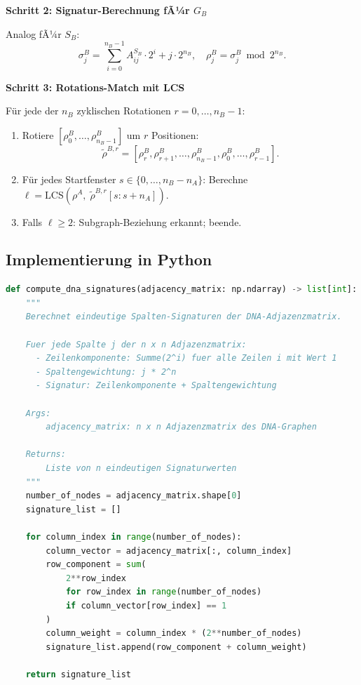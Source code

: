 ﻿\documentclass[a4paper,12pt]{article}
\theoremstyle{definition}
\begin{document}
\textbf{Schritt 2: Signatur-Berechnung fÃ¼r $G_B$}

Analog fÃ¼r $S_B$:
\[
    \sigma_j^B = \sum_{i=0}^{n_B-1} A^{S_B}_{ij} \cdot 2^i + j \cdot 2^{n_B},
    \quad \rho_j^B = \sigma_j^B \bmod 2^{n_B}.
\]

\textbf{Schritt 3: Rotations-Match mit LCS}

F\"{u}r jede der $n_B$ zyklischen Rotationen $r = 0, \ldots, n_B - 1$:
\begin{enumerate}
    \item Rotiere $[\rho_0^B, \ldots, \rho_{n_B-1}^B]$ um $r$ Positionen:
          \[
              \tilde{\rho}^{B,r} = [\rho_r^B, \rho_{r+1}^B, \ldots,
                                     \rho_{n_B-1}^B, \rho_0^B, \ldots, \rho_{r-1}^B].
          \]
    \item F\"{u}r jedes Startfenster $s \in \{0, \ldots, n_B - n_A\}$:
          Berechne
          $\ell = \mathrm{LCS}(\rho^A,\;
                               \tilde{\rho}^{B,r}[s : s + n_A])$.
    \item Falls $\ell \geq 2$: Subgraph-Beziehung erkannt; beende.
\end{enumerate}

\subsection{Implementierung in Python}

\begin{lstlisting}[language=Python, caption=Signatur-Berechnung fÃ¼r DNA-Adjazenzmatrix]
def compute_dna_signatures(adjacency_matrix: np.ndarray) -> list[int]:
    """
    Berechnet eindeutige Spalten-Signaturen der DNA-Adjazenzmatrix.

    Fuer jede Spalte j der n x n Adjazenzmatrix:
      - Zeilenkomponente: Summe(2^i) fuer alle Zeilen i mit Wert 1
      - Spaltengewichtung: j * 2^n
      - Signatur: Zeilenkomponente + Spaltengewichtung

    Args:
        adjacency_matrix: n x n Adjazenzmatrix des DNA-Graphen

    Returns:
        Liste von n eindeutigen Signaturwerten
    """
    number_of_nodes = adjacency_matrix.shape[0]
    signature_list = []

    for column_index in range(number_of_nodes):
        column_vector = adjacency_matrix[:, column_index]
        row_component = sum(
            2**row_index
            for row_index in range(number_of_nodes)
            if column_vector[row_index] == 1
        )
        column_weight = column_index * (2**number_of_nodes)
        signature_list.append(row_component + column_weight)

    return signature_list
\end{lstlisting}
\end{document}
